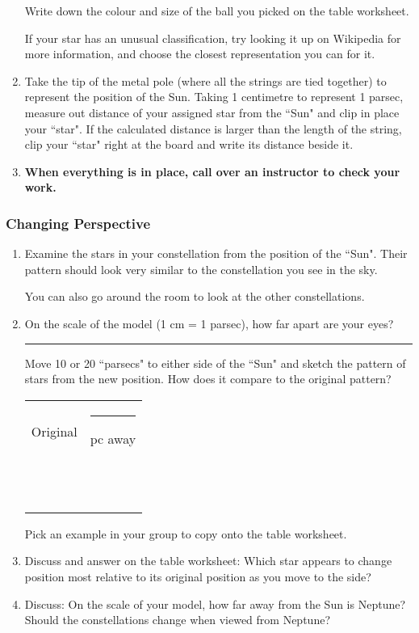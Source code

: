\documentclass[main.tex]{subfiles}
\begin{document}
\begin{enumerate}
Write down the colour and size of the ball you picked on the table worksheet.

If your star has an unusual classification, try looking it up on Wikipedia for more information, and choose the closest representation you can for it.
\item Take the tip of the metal pole (where all the strings are tied together) to represent the position of the Sun. Taking 1 centimetre to represent 1 parsec, measure out distance of your assigned star from the ``Sun" and clip in place your ``star". If the calculated distance is larger than the length of the string, clip your ``star" right at the board and write its distance beside it.
\item \textbf{When everything is in place, call over an instructor to check your work.}
\end{enumerate}

\subsubsection{Changing Perspective}
\begin{enumerate}
\item Examine the stars in your constellation from the position of the ``Sun". Their pattern should look very similar to the constellation you see in the sky.

You can also go around the room to look at the other constellations.
\item On the scale of the model (1 cm = 1 parsec), how far apart are your eyes?

\rule{5cm}{.15mm}

Move 10 or 20 ``parsecs" to either side of the ``Sun" and sketch the pattern of stars from the new position. How does it compare to the original pattern?
\begin{table}[h!]
\begin{center}
\begin{tabular}{|p{}|p{}|}\hline
Original & \rule{1cm}{.15mm} pc away \\
&\\
&\\
&\\
&\\
&\\
&\\
&\\
&\\
&\\
&\\\hline
\end{tabular}
\end{center}
\label{tab:constell}
\end{table}

Pick an example in your group to copy onto the table worksheet.
\item Discuss and answer on the table worksheet: Which star appears to change position most relative to its original position as you move to the side?
\item Discuss: On the scale of your model, how far away from the Sun is Neptune? Should the constellations change when viewed from Neptune?
\end{enumerate}
\end{document}
